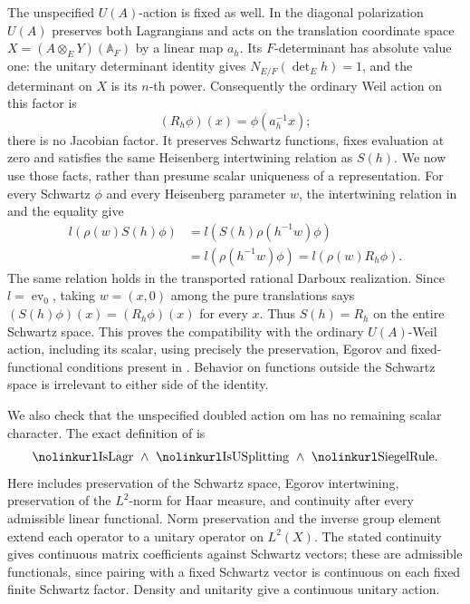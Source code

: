 The unspecified \(U(A)\)-action is fixed as well.
In the diagonal polarization \(U(A)\) preserves both
Lagrangians and acts on the translation coordinate space
\(X=(A\otimes_EY)(\mathbb A_F)\) by a linear map \(a_h\).
Its \(F\)-determinant has absolute value one:
the unitary determinant identity gives
\(N_{E/F}(\det_E h)=1\), and the determinant on \(X\)
is its \(n\)-th power.
Consequently the ordinary Weil action on this factor is
\[
                    (R_h\phi)(x)=\phi(a_h^{-1}x);
\]
there is no Jacobian factor.  It preserves Schwartz
functions, fixes evaluation at zero and satisfies the
same Heisenberg intertwining relation as \(S(h)\).
We now use those facts, rather than presume scalar
uniqueness of a representation.
For every Schwartz \(\phi\) and every Heisenberg
parameter \(w\), the intertwining relation in
 and the equality 
give
\[
 \begin{split}
 l\!\left(\rho(w)S(h)\phi\right)
   &=l\!\left(S(h)\rho(h^{-1}w)\phi\right)\\
   &=l\!\left(\rho(h^{-1}w)\phi\right)
    =l\!\left(\rho(w)R_h\phi\right).
 \end{split}
\]
The same relation holds in the transported rational
Darboux realization.
Since \(l=\operatorname{ev}_0\), taking \(w=(x,0)\)
among the pure translations says
\((S(h)\phi)(x)=(R_h\phi)(x)\) for every \(x\).
Thus \(S(h)=R_h\) on the entire Schwartz space.
This proves the compatibility with the ordinary
\(U(A)\)-Weil action, including its scalar, using precisely
the preservation, Egorov and fixed-functional conditions
present in .  Behavior on functions outside
the Schwartz space is irrelevant to either side of the
identity.

We also check that the unspecified doubled action
\(\mathrm{om}\) has no remaining scalar character.
The exact definition of  is
\[
  \srcid{IsLagr}\ \wedge\
  \srcid{IsUSplitting}\ \wedge\ \srcid{SiegelRule}.
\]
Here  includes preservation of the
Schwartz space, Egorov intertwining, preservation of
the \(L^2\)-norm for Haar measure, and continuity after
every admissible linear functional.
Norm preservation and the inverse group element extend
each operator to a unitary operator on \(L^2(X)\).
The stated continuity gives continuous matrix
coefficients against Schwartz vectors; these are
admissible functionals, since pairing with a fixed
Schwartz vector is continuous on each fixed finite
Schwartz factor.
Density and unitarity give a continuous unitary action.

